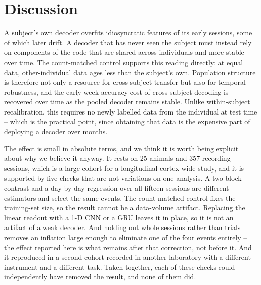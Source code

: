 \documentclass[mlmain,onecolumn]{jmlr}
\begin{document}
\section{Discussion}
A subject's own decoder overfits idiosyncratic features of its early sessions, some of which later
drift. A decoder that has never seen the subject must instead rely on components of the code that are
shared across individuals and more stable over time. The count-matched control supports this reading
directly: at equal data, other-individual data ages less than the subject's own. Population structure
is therefore not only a resource for cross-subject transfer but also for temporal robustness, and the
early-week accuracy cost of cross-subject decoding is recovered over time as the pooled decoder
remains stable. Unlike within-subject recalibration, this requires no newly labelled data from the
individual at test time -- which is the practical point, since obtaining that data is the expensive
part of deploying a decoder over months.

The effect is small in absolute terms, and we think it is worth being explicit about why we believe
it anyway. It rests on 25 animals and 357 recording sessions, which is a large cohort for a
longitudinal cortex-wide study, and it is supported by five checks that are not variations on one
analysis. A two-block contrast and a day-by-day regression over all fifteen sessions are different
estimators and select the same events. The count-matched control fixes the training-set size, so the
result cannot be a data-volume artifact. Replacing the linear readout with a 1-D CNN or a GRU leaves
it in place, so it is not an artifact of a weak decoder. And holding out whole sessions rather than
trials removes an inflation large enough to eliminate one of the four events entirely -- the effect
reported here is what remains after that correction, not before it. And it reproduced in a second
cohort recorded in another laboratory with a different instrument and a different task.
Taken together, each of these checks could independently have removed the result, and none of them
did.
\end{document}

